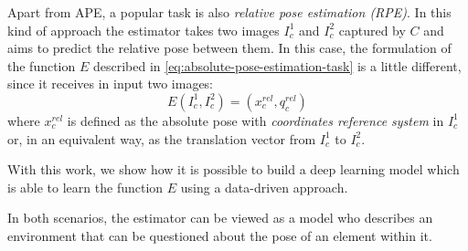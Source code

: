 Apart from APE, a popular task is also \emph{relative pose estimation (RPE)}. In this kind of approach the estimator takes two images $I_c^1$ and $I_c^2$ captured by $C$ and aims to predict the relative pose between them. In this case, the formulation of the function $E$ described in \cref{eq:absolute-pose-estimation-task} is a little different, since it receives in input two images:
\begin{equation}
    E(I_c^1, I_c^2) = (x_c^{rel}, q_c^{rel})
    \label{eq:relative-pose-estimation-task}
\end{equation}
where $x_c^{rel}$ is defined as the absolute pose with \emph{coordinates reference system} in $I_c^1$ or, in an equivalent way, as the translation vector from $I_c^1$ to $I_c^2$.

With this work, we show how it is possible to build a deep learning model which is able to learn the function $E$ using a data-driven approach.

In both scenarios, the estimator can be viewed as a model who describes an environment that can be questioned about the pose of an element within it.
